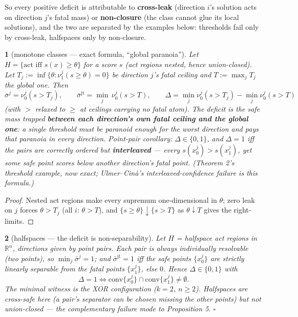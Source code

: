 \documentclass[11pt]{article}
\theoremstyle{plain}
\newtheorem*{namedthminner}{\namedthmname}
\newenvironment{nthm}[1]{\def\namedthmname{#1}\begin{namedthminner}}{\end{namedthminner}}
\theoremstyle{definition}
\begin{document}
So every positive deficit is attributable to \textbf{cross-leak} (direction $i$'s
solution acts on direction $j$'s fatal mass) or \textbf{non-closure} (the class
cannot glue its local solutions), and the two are separated by the examples
below: thresholds fail only by cross-leak, halfspaces only by non-closure.

\begin{nthm}{Proposition 5}[monotone classes --- exact formula, ``global paranoia'']
Let $H = \{ \text{act iff } s(x) \geq \theta \}$ for a score $s$ (act regions
nested, hence union-closed). Let $T_j := \inf\{\theta : \nu_1^j(s \geq
\theta) = 0\}$ be direction $j$'s fatal ceiling and $T := \max_j T_j$ the
global one. Then
$$\bar\sigma^j = \nu_0^j(s > T_j), \qquad \bar\sigma^{\mathrm{jt}} = \min_j\, \nu_0^j(s > T), \qquad \Delta = \min_j \nu_0^j(s > T_j) - \min_j \nu_0^j(s > T)$$
(with $>$ relaxed to $\geq$ at ceilings carrying no fatal atom). The deficit
is the safe mass trapped \textbf{between each direction's own fatal ceiling and the
global one}: a single threshold must be paranoid enough for the worst
direction and pays that paranoia in every direction. \emph{Point-pair corollary:}
$\Delta \in \{0,1\}$, and $\Delta = 1$ iff the pairs are correctly ordered
but \textbf{interleaved} --- every $s(x_0^j) > s(x_1^j)$, yet some safe point scores
below another direction's fatal point. (Theorem 2's threshold example, now
exact; Ulmer--Cin\`a's interleaved-confidence failure is this formula.)
\end{nthm}

\begin{proof}
Nested act regions make every supremum one-dimensional in $\theta$;
zero leak on $j$ forces $\theta > T_j$ (all $i$: $\theta > T$), and
$\{s \geq \theta\} \downarrow \{s > T\}$ as $\theta \downarrow T$ gives the
right-limits.
\end{proof}

\begin{nthm}{Proposition 6}[halfspaces --- the deficit is non-separability]
Let $H$ =
halfspace act regions in $\mathbb{R}^n$, directions given by point pairs.
Each pair is \emph{always} individually resolvable (two points), so
$\min_j \bar\sigma^j = 1$; and $\bar\sigma^{\mathrm{jt}} = 1$ iff the safe
points $\{x_0^j\}$ are strictly linearly separable from the fatal points
$\{x_1^j\}$, else $0$. Hence $\Delta \in \{0,1\}$ with
$$\Delta = 1 \iff \mathrm{conv}\{x_0^j\} \cap \mathrm{conv}\{x_1^j\} \neq \emptyset.$$
The minimal witness is the XOR configuration ($k = 2$, $n \geq 2$).
Halfspaces are cross-safe here (a pair's separator can be chosen missing the
other points) but not union-closed --- the complementary failure mode to
Proposition 5. \qquad $\square$
\end{nthm}
\end{document}
